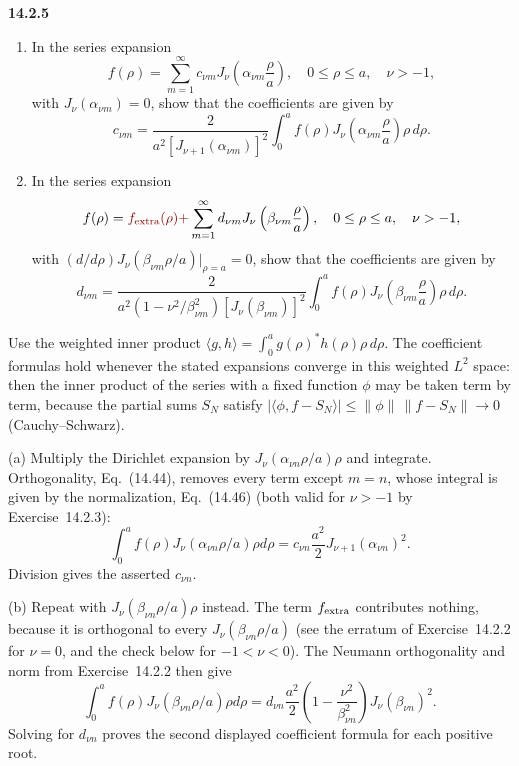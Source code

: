 \par\bigskip
\noindent\textbf{14.2.5}
\begin{enumerate}
\item[(a)] In the series expansion
\[
f(\rho)=\sum_{m=1}^{\infty}c_{\nu m}J_{\nu}\left(\alpha_{\nu m}
\frac{\rho}{a}\right),\quad0\le\rho\le a,\quad\nu>-1,
\]
with $J_{\nu}(\alpha_{\nu m})=0$, show that the coefficients are given
by
\[
c_{\nu m}=\frac{2}{a^{2}[J_{\nu+1}(\alpha_{\nu m})]^{2}}
\int_{0}^{a}f(\rho)J_{\nu}\left(\alpha_{\nu m}\frac{\rho}{a}\right)
\rho\,d\rho.
\]
\item[(b)] In the series expansion
\[
f(\rho)=\erratum{f_{\rm extra}(\rho)+}\sum_{m=1}^{\infty}d_{\nu m}J_{\nu}\left(\beta_{\nu m}
\frac{\rho}{a}\right),\quad0\le\rho\le a,\quad\nu>-1,
\]
with $(d/d\rho)J_{\nu}(\beta_{\nu m}\rho/a)\big|_{\rho=a}=0$, show
that the coefficients are given by
\[
d_{\nu m}=\frac{2}{a^{2}(1-\nu^{2}/\beta_{\nu m}^{2})
[J_{\nu}(\beta_{\nu m})]^{2}}
\int_{0}^{a}f(\rho)J_{\nu}\left(\beta_{\nu m}\frac{\rho}{a}\right)
\rho\,d\rho.
\]
\end{enumerate}
\par{}
\solution
Use the weighted inner product
$\langle g,h\rangle=\int_0^a g(\rho)^*h(\rho)\rho\,d\rho$.
The coefficient formulas hold whenever the stated expansions
converge in this weighted $L^2$ space: then the inner product of
the series with a fixed function $\phi$ may be taken term by term,
because the partial sums $S_N$ satisfy
$|\langle\phi,f-S_N\rangle|\le\|\phi\|\,\|f-S_N\|\to0$ (Cauchy--Schwarz).

(a) Multiply the Dirichlet expansion by
$J_\nu(\alpha_{\nu n}\rho/a)\rho$ and integrate. Orthogonality,
Eq.~(14.44), removes every term except $m=n$, whose integral is
given by the normalization, Eq.~(14.46) (both valid for $\nu>-1$ by
Exercise~14.2.3):
\[
\int_0^a f(\rho)J_\nu(\alpha_{\nu n}\rho/a)\rho d\rho
=c_{\nu n}\frac{a^2}{2}J_{\nu+1}(\alpha_{\nu n})^2.
\]
Division gives the asserted $c_{\nu n}$.

(b) Repeat with $J_\nu(\beta_{\nu n}\rho/a)\rho$ instead. The term
$f_{\rm extra}$ contributes nothing, because it is orthogonal to every
$J_\nu(\beta_{\nu n}\rho/a)$ (see the erratum of Exercise~14.2.2 for
$\nu=0$, and the check below for $-1<\nu<0$). The Neumann
orthogonality and norm from Exercise~14.2.2 then give
\[
\int_0^a f(\rho)J_\nu(\beta_{\nu n}\rho/a)\rho d\rho
=d_{\nu n}\frac{a^2}{2}
\left(1-\frac{\nu^2}{\beta_{\nu n}^2}\right)
J_\nu(\beta_{\nu n})^2.
\]
Solving for $d_{\nu n}$ proves the second displayed coefficient
formula for each positive root.

